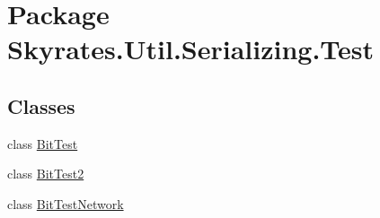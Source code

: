 \hypertarget{namespace_skyrates_1_1_util_1_1_serializing_1_1_test}{\section{Package Skyrates.\-Util.\-Serializing.\-Test}
\label{namespace_skyrates_1_1_util_1_1_serializing_1_1_test}
}
\subsection*{Classes}
\begin{DoxyCompactItemize}
\item 
class \hyperlink{class_skyrates_1_1_util_1_1_serializing_1_1_test_1_1_bit_test}{Bit\-Test}
\item 
class \hyperlink{class_skyrates_1_1_util_1_1_serializing_1_1_test_1_1_bit_test2}{Bit\-Test2}
\item 
class \hyperlink{class_skyrates_1_1_util_1_1_serializing_1_1_test_1_1_bit_test_network}{Bit\-Test\-Network}
\end{DoxyCompactItemize}
